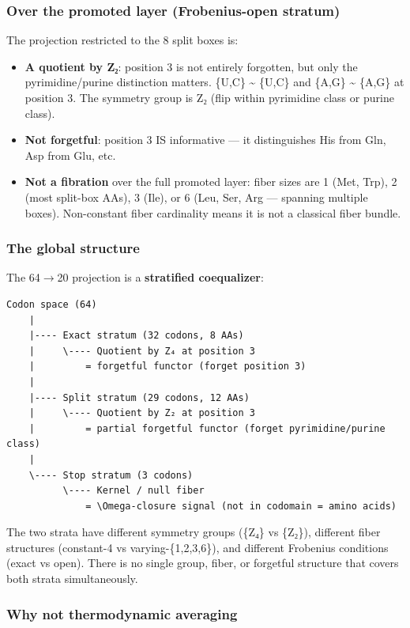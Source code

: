 \documentclass[12pt,a4paper]{article}
\begin{document}
\subsubsection{Over the promoted layer (Frobenius-open stratum)}

The projection restricted to the 8 split boxes is:

\begin{itemize}
    \item \textbf{A quotient by Z₂}: position 3 is not entirely forgotten, but only the
pyrimidine/purine distinction matters. \{U,C\} \textasciitilde{} \{U,C\} and \{A,G\} \textasciitilde{} \{A,G\} at
position 3. The symmetry group is Z₂ (flip within pyrimidine class or purine class).
    \item \textbf{Not forgetful}: position 3 IS informative --- it distinguishes His from Gln,
Asp from Glu, etc.
    \item \textbf{Not a fibration} over the full promoted layer: fiber sizes are 1 (Met, Trp),
2 (most split-box AAs), 3 (Ile), or 6 (Leu, Ser, Arg --- spanning multiple boxes).
Non-constant fiber cardinality means it is not a classical fiber bundle.
\end{itemize}

\subsubsection{The global structure}

The 64$\rightarrow$20 projection is a \textbf{stratified coequalizer}:

\begin{lstlisting}
Codon space (64)
    |
    |---- Exact stratum (32 codons, 8 AAs)
    |     \---- Quotient by Z₄ at position 3
    |         = forgetful functor (forget position 3)
    |
    |---- Split stratum (29 codons, 12 AAs)
    |     \---- Quotient by Z₂ at position 3
    |         = partial forgetful functor (forget pyrimidine/purine class)
    |
    \---- Stop stratum (3 codons)
          \---- Kernel / null fiber
              = \Omega-closure signal (not in codomain = amino acids)
\end{lstlisting}

The two strata have different symmetry groups (\{Z₄\} vs \{Z₂\}), different fiber
structures (constant-4 vs varying-\{1,2,3,6\}), and different Frobenius conditions
(exact vs open). There is no single group, fiber, or forgetful structure that covers
both strata simultaneously.

\subsubsection{Why not thermodynamic averaging}
\end{document}
